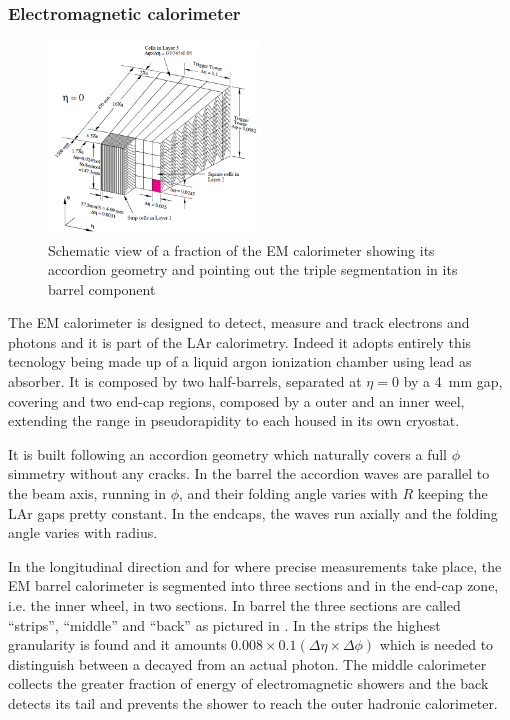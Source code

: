 \subsubsection{Electromagnetic calorimeter}
\begin{figure}[pt]
\centering
\includegraphics[width=0.5\textwidth]{LHC_ATLAS/EMcalo}
\caption{Schematic view of a fraction of the EM calorimeter showing its accordion geometry and pointing out the triple segmentation in its barrel component}
\label{fig:EMlayers}
\end{figure}

The EM calorimeter is designed to detect, measure and track electrons and photons and it is part of the LAr calorimetry. Indeed it adopts entirely this tecnology being made up of a liquid argon ionization chamber using lead as absorber. It is composed by two half-barrels, separated at $\eta=0$ by a \SI{4}{mm} gap, covering  and two end-cap regions, composed by a outer and an inner weel, extending the range in pseudorapidity to  each housed in its own cryostat. 

It is  built following an accordion geometry which naturally covers a full $\phi$ simmetry without any cracks. In the barrel the accordion waves are parallel to the beam axis, running in $\phi$, and their folding angle varies with $R$ keeping the LAr gaps pretty constant. In the endcaps, the waves run axially and the folding angle varies with radius.

In the longitudinal direction and for  where precise measurements take place, the EM barrel calorimeter is segmented into three sections and in the end-cap zone, i.e. the inner wheel, in two sections. In barrel the three sections are called ``strips'', ``middle'' and ``back'' as pictured in \Fig{\ref{fig:EMlayers}}. In the strips the highest granularity is found and it amounts $0.008 \times 0.1 \left(\Delta \eta \times \Delta \phi \right)$ which is needed to distinguish between a decayed \pizero from an actual photon. The middle calorimeter collects the greater fraction of energy of electromagnetic showers and the back detects its tail and prevents the shower to reach the outer hadronic calorimeter.

